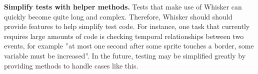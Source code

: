 \textbf{Simplify tests with helper methods.}
Tests that make use of Whisker can quickly become quite long and complex.
Therefore, Whisker should should provide features to help simplify test code.
For instance, one task that currently requires large amounts of code
is checking temporal relationships between two events,
for example ''at most one second after some sprite touches a border, some variable must be increased''.
In the future, testing may be simplified greatly by providing methods to handle cases like this.
\parspace

